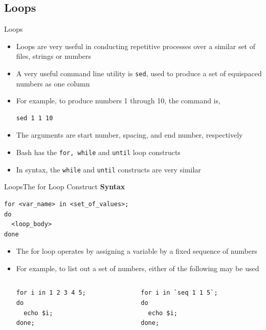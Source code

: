 \documentclass{beamer}
\begin{document}
\subsection{Loops}
\begin{frame}[fragile]{Loops}
  \begin{itemize}
  \item Loops are very useful in conducting repetitive processes over
    a similar set of files, strings or numbers
  \item A very useful command line utility is \verb|sed|, used to
    produce a set of equispaced numbers as one column
  \item For example, to produce numbers 1 through 10, the command is,
\begin{verbatim}
sed 1 1 10
\end{verbatim}
  \item The arguments are start number, spacing, and end number,
    respectively
  \item Bash has the \verb|for, while| and \verb|until| loop
    constructs
  \item In syntax, the \verb|while| and \verb|until| constructs are
    very similar
  \end{itemize}
\end{frame}

\begin{frame}[fragile]{Loops}{The for Loop Construct}
  \textbf{Syntax}\\
\begin{verbatim}
for <var_name> in <set_of_values>;
do
  <loop_body>
done
\end{verbatim}
  \begin{itemize}
  \item The for loop operates by assigning a variable by a fixed
    sequence of numbers
  \item For example, to list out a set of numbers, either of the
    following may be used
\begin{columns}
\begin{column}{0.3\textwidth}
\begin{verbatim}
for i in 1 2 3 4 5;
do
  echo $i;
done;
\end{verbatim}
\end{column}
\begin{column}{0.3\textwidth}
\begin{verbatim}
for i in `seq 1 1 5`;
do
  echo $i;
done;
\end{verbatim}
\end{column}
\end{columns}
  \end{itemize}
\end{frame}
\end{document}
